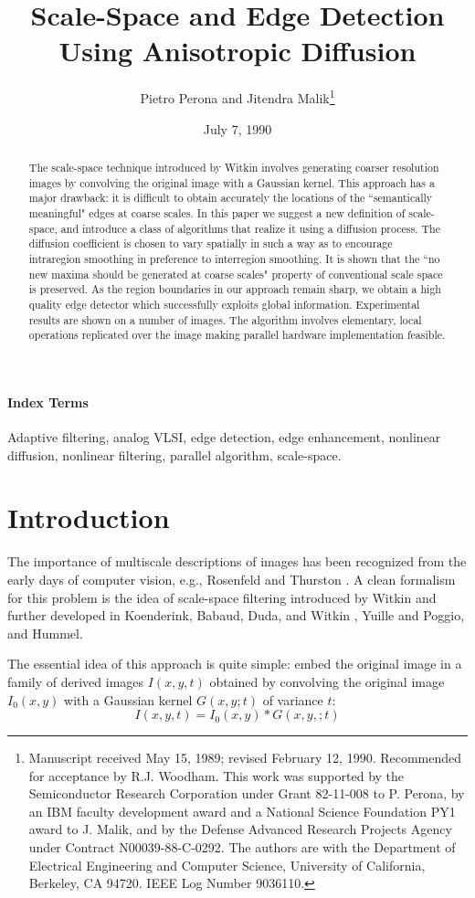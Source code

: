 \documentclass[10pt,letterpaper]{article}
\title{Scale-Space and Edge Detection Using Anisotropic Diffusion}
\author{Pietro Perona and Jitendra Malik\footnote{Manuscript received May 15, 1989; revised February 12, 1990. Recommended for acceptance by R.J. Woodham. This work was supported by the Semiconductor Research Corporation under Grant 82-11-008 to P. Perona, by an IBM faculty development award and a National Science Foundation PY1 award to J. Malik, and by the Defense Advanced Research Projects Agency under Contract N00039-88-C-0292. The authors are with the Department of Electrical Engineering and Computer Science, University of California, Berkeley, CA 94720. IEEE Log Number 9036110.}}
\date{July 7, 1990}
\begin{document}
	\maketitle
	
	\begin{abstract}
		The scale-space technique introduced by Witkin involves generating coarser resolution images by convolving the original image with a Gaussian kernel. This approach has a major drawback: it is difficult to obtain accurately the locations of the ``semantically meaningful" edges at coarse scales. In this paper we suggest a new definition of scale-space, and introduce a class of algorithms that realize it using a diffusion process. The diffusion coefficient is chosen to vary spatially in such a way as to encourage intraregion smoothing in preference to interregion smoothing. It is shown that the ``no new maxima should be generated at coarse scales" property of conventional scale space is preserved. As the region boundaries in our approach remain sharp, we obtain a high quality edge detector which successfully exploits global information. Experimental results are shown on a number of images. The algorithm involves elementary, local operations replicated over the image making parallel hardware implementation feasible.
	\end{abstract}
	
	\paragraph{Index Terms}Adaptive filtering, analog VLSI, edge detection, edge enhancement, nonlinear diffusion, nonlinear filtering, parallel algorithm, scale-space.
	
	\section{Introduction}
	The importance of multiscale descriptions of images has been recognized from the early days of computer vision, e.g., Rosenfeld and Thurston \cite{rosenfeld1971edge}. A clean formalism for this problem is the idea of scale-space filtering introduced by Witkin and further developed in Koenderink, Babaud, Duda, and Witkin \cite{babaud1986uniqueness}, Yuille and Poggio, and Hummel.
	
	The essential idea of this approach is quite simple: embed the original image in a family of derived images $I(x,y,t)$ obtained by convolving the original image $I_0(x,y)$ with a Gaussian kernel $G(x,y;t)$ of variance $t$:
	\begin{equation}
		I(x,y,t)=I_0(x,y)*G(x,y,;t)
	\end{equation}
	
\end{document}
